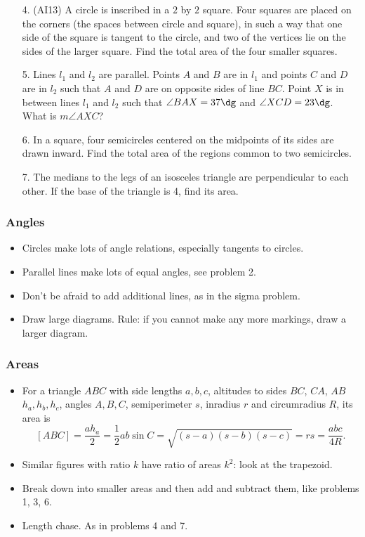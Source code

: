\documentclass[10pt,paper=letter]{scrartcl}
\begin{document}
\begin{enumerate}
  \item[4.] (AI13) A circle is inscribed in a $2$ by $2$ square. Four squares are placed on the corners (the spaces between circle and square), in such a way that one side of the square is tangent to the circle, and two of the vertices lie on the sides of the larger square. Find the total area of the four smaller squares.
  \item[5.] Lines $l_1$ and $l_2$ are parallel. Points $A$ and $B$ are in $l_1$ and points $C$ and $D$ are in $l_2$ such that $A$ and $D$ are on opposite sides of line $BC$. Point $X$ is in between lines $l_1$ and $l_2$ such that $\angle BAX = 37\dg$ and $\angle XCD = 23\dg$. What is $m\angle AXC$?
  \item[6.] In a square, four semicircles centered on the midpoints of its sides are drawn inward. Find the total area of the regions common to two semicircles.
  \item[7.] The medians to the legs of an isosceles triangle are perpendicular to each other. If the base of the triangle is 4, find its area.
\end{enumerate}

\subsubsection*{Angles}

\begin{itemize}
  \item Circles make lots of angle relations, especially tangents to circles.
  \item Parallel lines make lots of equal angles, see problem 2.
  \item Don't be afraid to add additional lines, as in the sigma problem. 
  \item Draw large diagrams. Rule: if you cannot make any more markings, draw a larger diagram.
\end{itemize}

\subsubsection*{Areas}
\begin{itemize}
  \item For a triangle $ABC$ with side lengths $a, b, c$, altitudes to sides $BC$, $CA$, $AB$ $h_a, h_b, h_c$, angles $A, B, C$, semiperimeter $s$, inradius $r$ and circumradius $R$, its area is
$$[ABC] = \frac{ah_a}{2} = \frac12 ab \sin C = \sqrt{(s-a)(s-b)(s-c)} = rs = \frac{abc}{4R}.$$
  \item Similar figures with ratio $k$ have ratio of areas $k^2$: look at the trapezoid.
  \item Break down into smaller areas and then add and subtract them, like problems 1, 3, 6.
  \item Length chase. As in problems 4 and 7.
\end{itemize}
\end{document}
